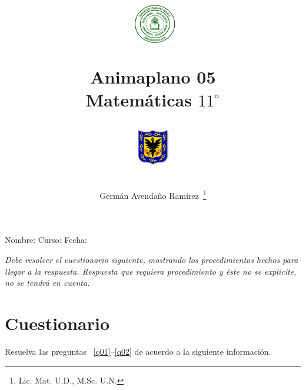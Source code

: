 \documentclass[letterpaper,11pt,twoside]{article}
\author{Germ\'an Avenda\~no Ram\'irez~\thanks{Lic. Mat. U.D., M.Sc. U.N.}}
\title{\begin{minipage}{.2\textwidth}
\includegraphics[height=1.75cm]{Images/logo-colegio.png}\end{minipage}
\begin{minipage}{.55\textwidth}
\begin{center}
Animaplano 05\\
Matemáticas $11^{\circ}$
\end{center}
\end{minipage}\hfill
\begin{minipage}{.2\textwidth}
\includegraphics[height=1.75cm]{Images/logo-sed.png} 
\end{minipage}}
\date{}
\begin{document}
\maketitle
Nombre: \hrulefill Curso: \underline{\hspace*{44pt}} Fecha: \underline{\hspace*{2.5cm}}
\begin{multicols}{2}
\textit{Debe resolver el cuestionario siguiente, mostrando los procedimientos hechos para llegar a la respuesta. Respuesta que requiera procedimiento y éste no se explicite, no se tendrá en cuenta.}
\section*{Cuestionario}
Resuelva las preguntas ~\ref{q01}--\ref{q02} de acuerdo a la siguiente información.


\end{multicols}
\end{document}

